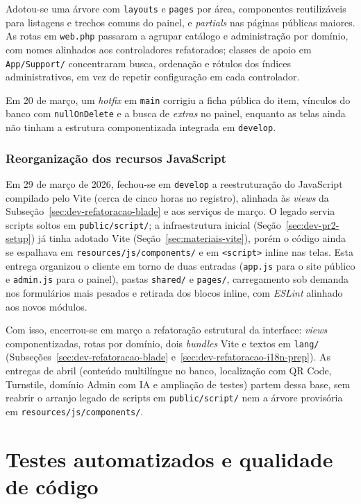 Adotou-se uma árvore com \texttt{layouts} e \texttt{pages} por área, componentes reutilizáveis para listagens e trechos comuns do painel, e \textit{partials} nas páginas públicas maiores. As rotas em \texttt{web.php} passaram a agrupar catálogo e administração por domínio, com nomes alinhados aos controladores refatorados; classes de apoio em \texttt{App/Support/} concentraram busca, ordenação e rótulos dos índices administrativos, em vez de repetir configuração em cada controlador.

Em 20 de março, um \textit{hotfix} em \texttt{main} corrigiu a ficha pública do item, vínculos do banco com \texttt{nullOnDelete} e a busca de \textit{extras} no painel, enquanto as telas ainda não tinham a estrutura componentizada integrada em \texttt{develop}.


\subsubsection{Reorganização dos recursos JavaScript}\label{sec:dev-refatoracao-javascript}

Em 29 de março de 2026, fechou-se em \texttt{develop} a reestruturação do JavaScript compilado pelo Vite (cerca de cinco horas no registro), alinhada às \textit{views} da Subseção~\ref{sec:dev-refatoracao-blade} e aos serviços de março. O legado servia scripts soltos em \texttt{public/script/}; a infraestrutura inicial (Seção~\ref{sec:dev-pr2-setup}) já tinha adotado Vite (Seção~\ref{sec:materiais-vite}), porém o código ainda se espalhava em \texttt{resources/js/components/} e em \texttt{<script>} inline nas telas. Esta entrega organizou o cliente em torno de duas entradas (\texttt{app.js} para o site público e \texttt{admin.js} para o painel), pastas \texttt{shared/} e \texttt{pages/}, carregamento sob demanda nos formulários mais pesados e retirada dos blocos inline, com \textit{ESLint} alinhado aos novos módulos.

Com isso, encerrou-se em março a refatoração estrutural da interface: \textit{views} componentizadas, rotas por domínio, dois \textit{bundles} Vite e textos em \texttt{lang/} (Subseções~\ref{sec:dev-refatoracao-blade} e~\ref{sec:dev-refatoracao-i18n-prep}). As entregas de abril (conteúdo multilíngue no banco, localização com QR Code, Turnstile, domínio Admin com IA e ampliação de testes) partem dessa base, sem reabrir o arranjo legado de scripts em \texttt{public/script/} nem a árvore provisória em \texttt{resources/js/components/}.


\section{Testes automatizados e qualidade de código}\label{sec:dev-testes}

